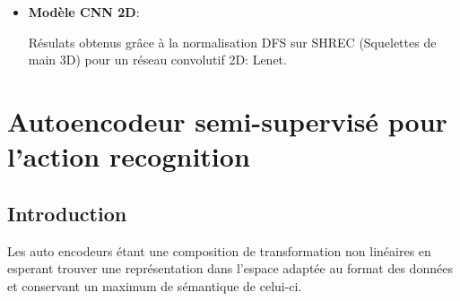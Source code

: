 \begin{itemize}
    
    
    
    
    
    
    
    
    
    
    
    
    \item \textbf{Modèle CNN 2D}:
    \begin{table}[H]
\centering
{}
\end{table}
{Résulats obtenus grâce à la normalisation DFS sur SHREC \cite{de2017shrec} (Squelettes de main 3D) pour un réseau convolutif 2D: Lenet.}
\end{itemize}








\section{Autoencodeur semi-supervisé pour l'action recognition}

\subsection{Introduction}
Les auto encodeurs étant une composition de transformation non linéaires en esperant trouver une représentation dans l'espace adaptée au format des données et conservant un maximum de sémantique de celui-ci.

